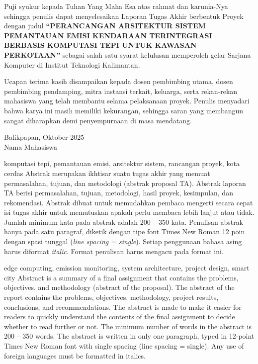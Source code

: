 \documentclass[proyek,laporan]{itkta2025}
\begin{document}
\makecover
\makeorisinalitas
\makepublikasi
\makepengeshan

Puji syukur kepada Tuhan Yang Maha Esa atas rahmat dan karunia-Nya sehingga penulis dapat menyelesaikan Laporan Tugas Akhir berbentuk Proyek dengan judul \textbf{``PERANCANGAN ARSITEKTUR SISTEM PEMANTAUAN EMISI KENDARAAN TERINTEGRASI BERBASIS KOMPUTASI TEPI UNTUK KAWASAN PERKOTAAN''} sebagai salah satu syarat kelulusan memperoleh gelar Sarjana Komputer di Institut Teknologi Kalimantan.

Ucapan terima kasih disampaikan kepada dosen pembimbing utama, dosen pembimbing pendamping, mitra instansi terkait, keluarga, serta rekan-rekan mahasiswa yang telah membantu selama pelaksanaan proyek. Penulis menyadari bahwa karya ini masih memiliki kekurangan, sehingga saran yang membangun sangat diharapkan demi penyempurnaan di masa mendatang.

\vspace{1.2cm}
\begin{flushright}
  Balikpapan, Oktober 2025\\[1.5cm]
  Nama Mahasiswa
\end{flushright}

\begin{abstrakid}{komputasi tepi, pemantauan emisi, arsitektur sistem, rancangan proyek, kota cerdas}
Abstrak merupakan ikhtisar suatu tugas akhir yang memuat permasalahan, tujuan, dan metodologi (abstrak proposal TA). Abstrak laporan TA berisi permasalahan, tujuan, metodologi, hasil proyek, kesimpulan, dan rekomendasi. Abstrak dibuat untuk memudahkan pembaca mengerti secara cepat isi tugas akhir untuk memutuskan apakah perlu membaca lebih lanjut atau tidak. Jumlah minimum kata pada abstrak adalah 200 -- 350 kata. Penulisan abstrak hanya pada satu paragraf, diketik dengan tipe font Times New Roman 12 poin dengan spasi tunggal (\textit{line spacing = single}). Setiap penggunaan bahasa asing harus diformat \textit{italic}. Format penulisan harus mengacu pada format ini.
\end{abstrakid}

\begin{abstraken}{edge computing, emission monitoring, system architecture, project design, smart city}
Abstract is a summary of a final assignment that contains the problems, objectives, and methodology (abstract of the proposal). The abstract of the report contains the problems, objectives, methodology, project results, conclusions, and recommendations. The abstract is made to make it easier for readers to quickly understand the contents of the final assignment to decide whether to read further or not. The minimum number of words in the abstract is 200 -- 350 words. The abstract is written in only one paragraph, typed in 12-point Times New Roman font with single spacing (line spacing = single). Any use of foreign languages must be formatted in italics.
\end{abstraken}
\end{document}
